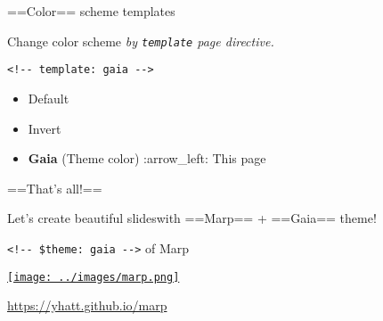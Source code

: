 \documentclass[ignorenonframetext,]{beamer}
\providecommand{\tightlist}{%
  \setlength{\itemsep}{0pt}\setlength{\parskip}{0pt}}
\begin{document}
\begin{frame}[fragile]{==Color== scheme templates}

Change color scheme \emph{by \texttt{template} page directive.}

\begin{verbatim}
<!-- template: gaia -->
\end{verbatim}

\begin{itemize}
\tightlist
\item
  Default
\item
  Invert
\item
  \textbf{Gaia} (Theme color) :arrow\_left: This page
\end{itemize}

\end{frame}

\begin{frame}{==That's all!==}

\begin{block}{Let's create beautiful slideswith ==Marp== + ==Gaia==
theme!}

\end{block}

\end{frame}

\begin{frame}

\begin{block}{\texttt{\textless{}!-\/-\ \$theme:\ gaia\ -\/-\textgreater{}}
of Marp}

\begin{block}{\href{https://yhatt.github.io/marp}{\texttt{[image: ../images/marp.png]}}}

\end{block}

\end{block}

\begin{block}{\url{https://yhatt.github.io/marp}}

\end{block}

\end{frame}
\end{document}
